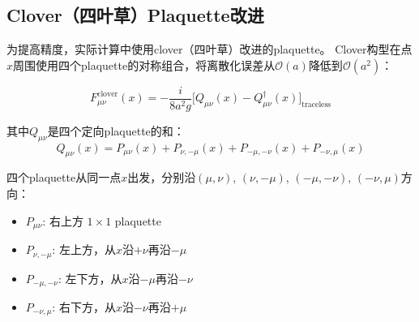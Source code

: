 \documentclass[12pt,a4paper]{ctexart}
\begin{document}
\subsection{Clover（四叶草）Plaquette改进}

为提高精度，实际计算中使用clover（四叶草）改进的plaquette。
Clover构型在点$x$周围使用四个plaquette的对称组合，将离散化误差从$\mathcal{O}(a)$降低到$\mathcal{O}(a^2)$：

\begin{physbox}[Clover改进的场强张量]
\begin{equation}
    F_{\mu\nu}^{\text{clover}}(x) = -\frac{i}{8a^2g} \Big[
        Q_{\mu\nu}(x) - Q_{\mu\nu}^\dagger(x)
    \Big]_{\text{traceless}}
    \label{eq:clover_F}
\end{equation}

其中$Q_{\mu\nu}$是四个定向plaquette的和：
\begin{equation}
    Q_{\mu\nu}(x) = P_{\mu\nu}(x) + P_{\nu,-\mu}(x) + P_{-\mu,-\nu}(x) + P_{-\nu,\mu}(x)
    \label{eq:Q_clover}
\end{equation}

四个plaquette从同一点$x$出发，分别沿$(\mu,\nu)$, $(\nu,-\mu)$, $(-\mu,-\nu)$, $(-\nu,\mu)$方向：
\begin{itemize}
    \item $P_{\mu\nu}$: 右上方 $1\times 1$ plaquette
    \item $P_{\nu,-\mu}$: 左上方，从$x$沿$+\nu$再沿$-\mu$
    \item $P_{-\mu,-\nu}$: 左下方，从$x$沿$-\mu$再沿$-\nu$
    \item $P_{-\nu,\mu}$: 右下方，从$x$沿$-\nu$再沿$+\mu$
\end{itemize}
\end{physbox}
\end{document}
